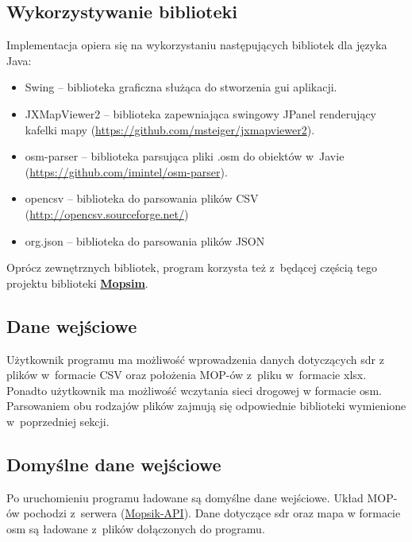 \subsection{Wykorzystywanie biblioteki}
Implementacja opiera się na wykorzystaniu następujących bibliotek dla języka
Java:
\begin{itemize}
\item Swing -- biblioteka graficzna służąca do stworzenia \acrshort{gui} aplikacji.
\item JXMapViewer2 -- biblioteka zapewniająca swingowy JPanel renderujący
  kafelki mapy (\url{https://github.com/msteiger/jxmapviewer2}).
\item osm-parser -- biblioteka parsująca pliki .osm do obiektów w~Javie
  (\url{https://github.com/imintel/osm-parser}).
\item opencsv -- biblioteka do parsowania plików CSV
  (\url{http://opencsv.sourceforge.net/})
\item org.json -- biblioteka do parsowania plików JSON 
\end{itemize}
Oprócz zewnętrznych bibliotek, program korzysta też z~będącej częścią tego
projektu biblioteki \hyperref[r:mopsim]{\textbf{Mopsim}}. 
\subsection{Dane wejściowe}
Użytkownik programu ma możliwość wprowadzenia danych dotyczących \acrshort{sdr}
z plików w~formacie CSV oraz położenia MOP-ów z~pliku w~formacie xlsx. 
Ponadto użytkownik ma możliwość wczytania sieci drogowej w
formacie \acrshort{osm}. Parsowaniem obu rodzajów plików zajmują się odpowiednie
biblioteki wymienione w~poprzedniej sekcji.
\subsection{Domyślne dane wejściowe}
Po uruchomieniu programu ładowane są domyślne dane wejściowe. Układ MOP-ów
pochodzi z~serwera (\hyperref[mopsik_api]{Mopsik-API}). Dane dotyczące \acrshort{sdr} oraz mapa w
formacie \acrshort{osm} są
ładowane z~plików dołączonych do programu. 
